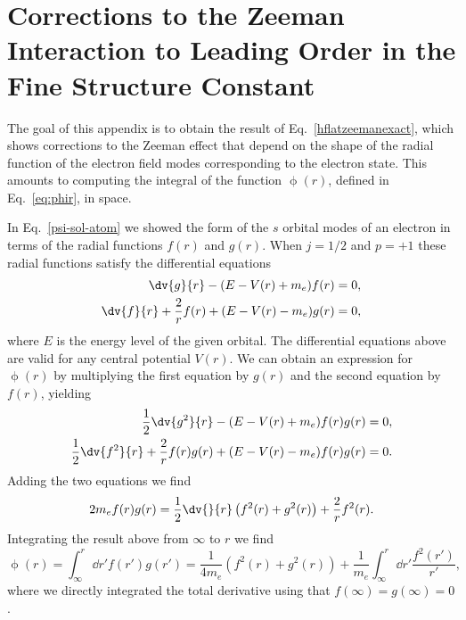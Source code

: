 \documentclass[letterpaper,12pt,titlepage,oneside,final]{book}
\begin{document}
\chapter{Corrections to the Zeeman Interaction to Leading Order in the Fine Structure Constant}\label{app:derivation}


The goal of this appendix is to obtain the result of Eq.~\eqref{hflatzeemanexact}, which shows corrections to the Zeeman effect that depend on the shape of the radial function of the electron field modes corresponding to the electron state. This amounts to computing the integral of the function $\upphi(r)$, defined in Eq.~\eqref{eq:phir}, in space.

In Eq.~\eqref{psi-sol-atom} we showed the form of the $s$ orbital modes of an electron in terms of the radial functions $f(r)$ and $g(r)$. When $j=1/2$ and $p=+1$ these radial functions satisfy the differential equations~\cite{RQMgreiner}
\begin{align}
    \dv{g}{r} - (E-V(r)+m_e)f(r) &= 0,\\
    \dv{f}{r} +\frac{2}{r} f(r) + (E-V(r)-m_e)g(r) &= 0,
\end{align}
where $E$ is the energy level of the given orbital. The differential equations above are valid for any central potential $V(r)$. We can obtain an expression for $\upphi(r)$ by multiplying the first equation by $g(r)$ and the second equation by $f(r)$, yielding
\begin{align}
    \frac{1}{2}\dv{g^2}{r} - (E-V(r)+m_e)f(r)g(r) &= 0,\\
    \frac{1}{2}\dv{f^2}{r} +\frac{2}{r} f(r)g(r) + (E-V(r)-m_e)f(r)g(r) &= 0.
\end{align}
Adding the two equations we find
\begin{align}
    2m_e f(r) g(r) = \frac{1}{2}\dv{}{r}\left(f^2(r) + g^2(r)\right)+ \frac{2}{r} f^2(r).
\end{align}
Integrating the result above from $\infty$ to $r$ we find
\begin{equation}
    \upphi(r) = \int_{\infty}^r \dd r' f(r') g(r') = \frac{1}{4m_e}(f^2(r) + g^2(r)) + \frac{1}{m_e} \int_\infty^r \dd r' \frac{f^2(r')}{r'},
\end{equation}
where we directly integrated the total derivative using that $f(\infty) = g(\infty) = 0$. 
\end{document}
